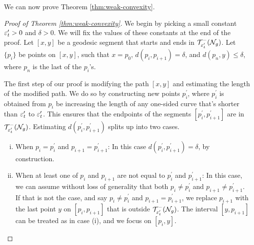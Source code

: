 \documentclass[12pt, reqno]{amsart}
\begin{document}
We can now prove Theorem \ref{thm:weak-convexity}.

\begin{proof}[Proof of Theorem \ref{thm:weak-convexity}]
  We begin by picking a small constant $\varepsilon_t^{\prime} > 0$ and $\delta > 0$.
  We will fix the values of these constants at the end of the proof.
  Let $[x,y]$ be a geodesic segment that starts and ends in $\mathcal{T}_{\varepsilon_t^{\prime}}^{-}(\mathcal{N}_g)$.
  Let $\{p_i\}$ be points on $[x,y]$, such that $x = p_0$, $d(p_i, p_{i+1}) = \delta$, and $d(p_n, y) \leq \delta$, where $p_n$ is the last of the $p_i$'s.

  The first step of our proof is modifying the path $[x,y]$ and estimating the length of the modified path.
  We do so by constructing new points $p_i^{\prime}$, where $p_i^{\prime}$ is obtained from $p_i$ be increasing the length of any one-sided curve that's shorter than $\varepsilon_t^{\prime}$ to $\varepsilon_t^{\prime}$.
  This ensures that the endpoints of the segments $[p_i^{\prime}, p_{i+1}^{\prime}]$ are in $\mathcal{T}_{\varepsilon_t^{\prime}}^{-}(\mathcal{N}_g)$.
  Estimating $d(p_i^{\prime}, p_{i+1}^{\prime})$ splits up into two cases.
  \begin{enumerate}[(i)]
  \item When $p_i = p_i^{\prime}$ and $p_{i+1} = p_{i+1}^{\prime}$: In this case $d(p_i^{\prime}, p_{i+1}^{\prime}) = \delta$, by construction.
  \item When at least one of $p_i$ and $p_{i+1}$ are not equal to $p_i^{\prime}$ and $p_{i+1}^{\prime}$: In this case, we can assume without loss of generality that both $p_i \neq p_i^{\prime}$ and $p_{i+1} \neq p_{i+1}^{\prime}$.
    If that is not the case, and say $p_i \neq p_i^{\prime}$ and $p_{i+1} = p_{i+1}^{\prime}$, we replace $p_{i+1}$ with the last point $y$ on $[p_i, p_{i+1}]$ that is outside $\mathcal{T}_{\varepsilon_t^{\prime}}^{-}(\mathcal{N}_g)$.
    The interval $[y, p_{i+1}]$ can be treated as in case (i), and we focus on $[p_i, y]$.


\end{enumerate}
\end{proof}
\end{document}
